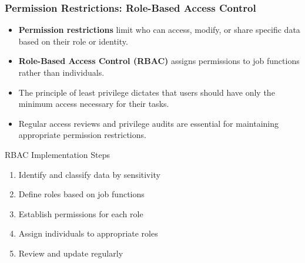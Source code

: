 \documentclass{beamer}
\begin{document}
    \begin{frame}
    \frametitle{Permission Restrictions: Role-Based Access Control}
    \begin{itemize}
        \item \textbf{Permission restrictions} limit who can access, modify, or share specific data based on their role or identity.
        \item \textbf{Role-Based Access Control (RBAC)} assigns permissions to job functions rather than individuals.
        \item The principle of least privilege dictates that users should have only the minimum access necessary for their tasks.
        \item Regular access reviews and privilege audits are essential for maintaining appropriate permission restrictions.
    \end{itemize}
    
    \begin{block}{RBAC Implementation Steps}
        \begin{enumerate}
            \item Identify and classify data by sensitivity
            \item Define roles based on job functions
            \item Establish permissions for each role
            \item Assign individuals to appropriate roles
            \item Review and update regularly
        \end{enumerate}
    \end{block}
    \end{frame}
\end{document}
